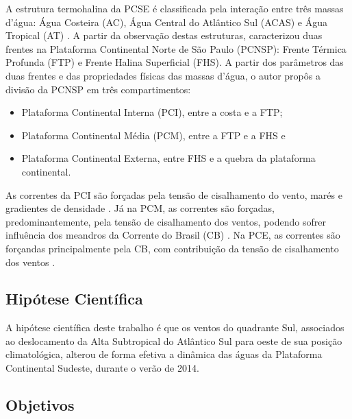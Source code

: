 
\hspace{6mm} A estrutura termohalina da PCSE é classificada pela interação entre
três massas d'água: Água Costeira (AC), Água Central do Atlântico Sul (ACAS) e
Água Tropical (AT) \cite{Castro1987}. A partir da observação destas estruturas,
 caracterizou duas frentes na Plataforma Continental Norte
de São Paulo (PCNSP): Frente Térmica Profunda (FTP) e Frente Halina Superficial (FHS).
A partir dos parâmetros das duas frentes e das propriedades físicas das massas
d'água, o autor propôs a divisão da PCNSP em três compartimentos:

\begin{itemize}
    \item Plataforma Continental Interna (PCI), entre a costa e a FTP;
    \item Plataforma Continental Média (PCM), entre a FTP e a FHS e
    \item Plataforma Continental Externa, entre FHS e a quebra da plataforma continental.
\end{itemize}

\hspace{6mm} As correntes da PCI são forçadas pela tensão de cisalhamento do vento,
marés e gradientes de densidade . Já na PCM, as correntes são forçadas, predominantemente,
pela tensão de cisalhamento dos ventos, podendo sofrer influência dos meandros da 
Corrente do Brasil (CB) . Na PCE, as correntes são forçandas principalmente pela CB, 
com contribuição da tensão de cisalhamento dos ventos .

\subsection{Hipótese Científica}
\label{sub:hipotese}

A hipótese científica deste trabalho é que os ventos do quadrante Sul, associados
ao deslocamento da Alta Subtropical do Atlântico Sul para oeste de sua posição
climatológica, alterou de forma efetiva a dinâmica das águas da Plataforma
Continental Sudeste, durante o verão de 2014.

\subsection{Objetivos}
\label{sub:objetivos}

